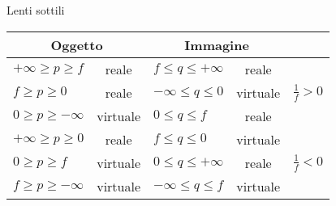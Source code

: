 \documentclass[10pt, twocolumn, a4paper, fleqn]{article}
\def\[{\left[}
\begin{document}
Lenti sottili
\begin{center}
\begin{tabularx}{\textwidth}{Xc| Xc |c}
\toprule
\multicolumn{2}{c}{Oggetto} 			& \multicolumn{2}{c}{Immagine} 				& \\
\midrule
$+\infty\ge p\ge f$ 		& reale 		& $f\le q\le +\infty$ 			& reale 		& \\[2ex]
$f\ge p\ge 0$ 			& reale 		& $-\infty\le q\le 0$ 			& virtuale 		& $\frac{1}{f}>0$ \\[2ex]
$0\ge p\ge -\infty$ 		& virtuale 		& $0\le q \le f$ 				& reale 		& \\[2ex]
\midrule
$+\infty\ge p\ge 0$ 		& reale 		& $f\le q\le 0$ 				& virtuale 		& \\[2ex]
$0\ge p\ge f$ 			& virtuale 		& $0\le q\le +\infty$ 			& reale 		& $\frac{1}{f}<0$ \\[2ex]
$f\ge p\ge -\infty$ 		& virtuale 		& $-\infty\le q \le f$ 			& virtuale 		& \\[2ex]
\bottomrule
\end{tabularx}
\end{center}




\end{document}
